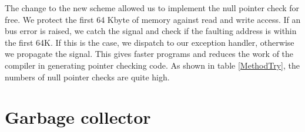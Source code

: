 The change to the new scheme allowed us to implement the null pointer
check for free. We protect the first 64 Kbyte of memory against read
and write access. If an bus error is raised, we catch the signal and
check if the faulting address is within the first 64K. If this is the
case, we dispatch to our exception handler, otherwise we propagate the
signal. This gives faster programs and reduces the work of the
compiler in generating pointer checking code. As shown in table
\ref{MethodTry}, the numbers of null pointer checks are quite high.


\section{Garbage collector}



